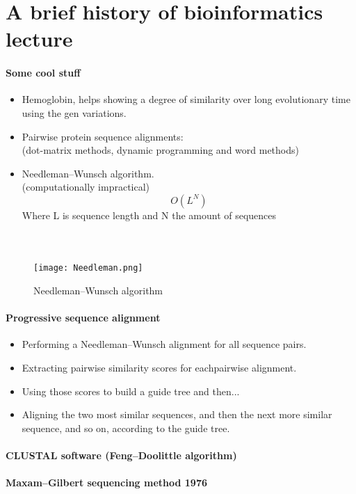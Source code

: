 
\section{A brief history of bioinformatics lecture}


\paragraph{Some cool stuff}

\begin{itemize}
    \item Hemoglobin, helps showing a degree of similarity
    over long evolutionary time using the gen variations.
    \item Pairwise protein sequence alignments: \\
    (dot-matrix methods, dynamic programming and word methods)
    \item Needleman–Wunsch algorithm. \\
    (computationally impractical)
    \[O(L^{N})\]
    Where L is sequence length and N the amount of sequences
\end{itemize}
\paragraph{\\}
\begin{figure}[htbp]
    \centerline{\texttt{[image: Needleman.png]}}
    \caption{Needleman–Wunsch algorithm}
    \label{fig5}
\end{figure}

\paragraph*{Progressive sequence alignment} 

\begin{itemize}
    \item Performing a Needleman–Wunsch alignment for all sequence pairs.
    \item Extracting pairwise similarity scores for eachpairwise alignment.
    \item Using those scores to build a guide tree and then... 
    \item Aligning the two most similar sequences, and then
    the next more similar sequence, and so on, according to the
    guide tree.
\end{itemize}

\paragraph*{CLUSTAL software (Feng–Doolittle algorithm)} 

\paragraph*{Maxam–Gilbert sequencing method 1976} 




